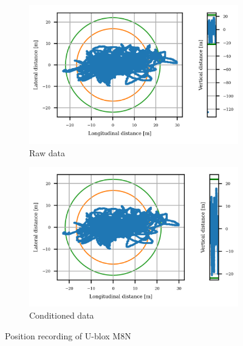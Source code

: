 \documentclass{article}
\begin{document}
			\begin{figure}[h]
		   		\centering
		     	\begin{subfigure}[b]{0.45\textwidth}
		      		\centering
		      	  	\includegraphics[width=\textwidth]{Static/raw_static_MTK 3339.png}
		      	  	\caption{Raw data}
		     	\end{subfigure}
		     	\begin{subfigure}[b]{0.45\textwidth}
		      	   \centering
		      	   \includegraphics[width=\textwidth]{Static/cond_static_MTK 3339.png}
		      	   \caption{Conditioned data}
		     	\end{subfigure}
		      \caption{Position recording of U-blox M8N}
		      \label{fig:static_loc_gadget1}
			\end{figure}		
\end{document}
